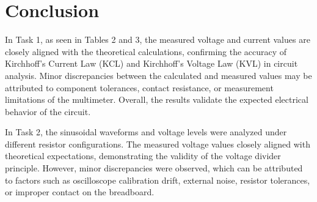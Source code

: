 \documentclass{article}
\begin{document}
\section{Conclusion}
  


  In Task 1, as seen in Tables 2 and 3, the measured voltage and current values are closely aligned with the theoretical calculations, confirming the accuracy of Kirchhoff’s Current Law (KCL) and Kirchhoff’s Voltage Law (KVL) in circuit analysis. Minor discrepancies between the calculated and measured values may be attributed to component tolerances, contact resistance, or measurement limitations of the multimeter. Overall, the results validate the expected electrical behavior of the circuit.


  In Task 2, the sinusoidal waveforms and voltage levels were analyzed under different resistor configurations. The measured voltage values closely aligned with theoretical expectations, demonstrating the validity of the voltage divider principle. However, minor discrepancies were observed, which can be attributed to factors such as oscilloscope calibration drift, external noise, resistor tolerances, or improper contact on the breadboard.
\end{document}
